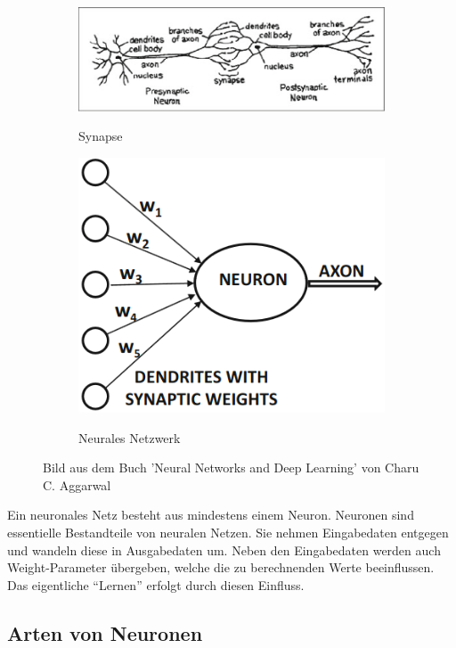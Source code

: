 \begin{figure}[H]
\begin{subfigure}{0.6\textwidth}
    \includegraphics[width=\textwidth]{Sources/01-01_synapse.png}
    \label{Synapse}
    \caption{Synapse}
\end{subfigure}
\begin{subfigure}{0.25\textwidth}
    \includegraphics[width=\textwidth]{Sources/01-02_neuron.png}
    \label{Neuron}
    \caption{Neurales Netzwerk}
\end{subfigure}
\caption{Bild aus dem Buch 'Neural Networks and Deep Learning' von Charu C. Aggarwal
}
\end{figure}
\noindent
Ein neuronales Netz besteht aus mindestens einem Neuron. Neuronen sind essentielle Bestandteile von neuralen Netzen. Sie nehmen Eingabedaten entgegen und wandeln diese 
in Ausgabedaten um. Neben den Eingabedaten werden auch Weight-Parameter übergeben, welche die zu berechnenden Werte beeinflussen. Das eigentliche \enquote{Lernen} erfolgt durch diesen 
Einfluss.\cite{CA18}
\subsection{Arten von Neuronen}\label{subsec:neuronen:arten_von_neuronen}
